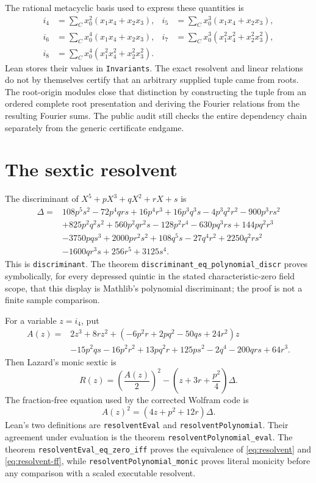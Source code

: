 \documentclass[11pt,a4paper,oneside]{article}
\newcommand{\lean}[1]{\nolinkurl{#1}}
\newcommand{\ii}[1]{i_{#1}}
\begin{document}
The rational metacyclic basis used to express these quantities is
\begin{align*}
\ii4&=\sum_C x_0^2(x_1x_4+x_2x_3),&
\ii5&=\sum_C x_0^3(x_1x_4+x_2x_3),\\
\ii6&=\sum_C x_0^4(x_1x_4+x_2x_3),&
\ii7&=\sum_C x_0^3(x_1^2x_4^2+x_2^2x_3^2),\\
\ii8&=\sum_C x_0^4(x_1^2x_4^2+x_2^2x_3^2).&&
\end{align*}
Lean stores their values in \lean{Invariants}.  The exact resolvent and linear
relations do not by themselves certify that an arbitrary supplied tuple came
from roots.  The root-origin modules close that distinction by constructing
the tuple from an ordered complete root presentation and deriving the Fourier
relations from the resulting Fourier sums.  The public audit still checks the
entire dependency chain separately from the generic certificate endgame.

\section{The sextic resolvent}

The discriminant of $X^5+pX^3+qX^2+rX+s$ is
\begin{align*}
\Delta={}&108p^5s^2-72p^4qrs+16p^4r^3+16p^3q^3s-4p^3q^2r^2
 -900p^3rs^2\\
&+825p^2q^2s^2+560p^2qr^2s-128p^2r^4-630pq^3rs
 +144pq^2r^3\\
&-3750pqs^3+2000pr^2s^2+108q^5s-27q^4r^2
 +2250q^2rs^2\\
&-1600qr^3s+256r^5+3125s^4.
\end{align*}
This is \lean{discriminant}.  The theorem
\lean{discriminant_eq_polynomial_discr} proves symbolically, for every
depressed quintic in the stated characteristic-zero field scope, that this
display is Mathlib's polynomial discriminant; the proof is not a finite
sample comparison.

For a variable $z=\ii4$, put
\begin{align*}
A(z)={}&2z^3+8rz^2+(-6p^2r+2pq^2-50qs+24r^2)z\\
&-15p^2qs-16p^2r^2+13pq^2r+125ps^2
-2q^4-200qrs+64r^3.
\end{align*}
Then Lazard's monic sextic is
\begin{equation}\label{eq:resolvent}
 R(z)=\left(\frac{A(z)}2\right)^2-
 \left(z+3r+\frac{p^2}{4}\right)\Delta.
\end{equation}
The fraction-free equation used by the corrected Wolfram code is
\begin{equation}\label{eq:resolvent-ff}
 A(z)^2=(4z+p^2+12r)\Delta.
\end{equation}
Lean's two definitions are \lean{resolventEval} and
\lean{resolventPolynomial}.  Their agreement under evaluation is the theorem
\lean{resolventPolynomial_eval}.  The theorem
\lean{resolventEval_eq_zero_iff} proves the equivalence of
\eqref{eq:resolvent} and \eqref{eq:resolvent-ff}, while
\lean{resolventPolynomial_monic} proves literal monicity before any comparison
with a scaled executable resolvent.
\end{document}
